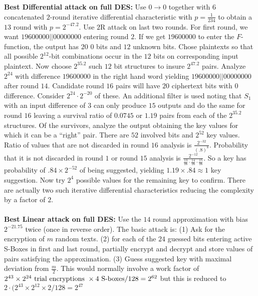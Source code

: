 \\
\\
{\bf Best Differential attack on full DES: }
Use $0 \rightarrow 0$ together with $6$ concatenated $2$-round iterative differential 
characteristic with $p= {\frac 1 {234}}$ to obtain a $13$ round with $p= 2^{-47.2}$.
Use $2$R attack on last two rounds.  For first round, we want $19 60 00 00 || 00 00 00 00$
entering round $2$.  If we get $19 60 00 00$ to enter the $F$-function, the output
has $20$ $0$ bits and $12$ unknown bits. Chose plaintexts so that all possible
$2^{12}$-bit combinations occur in the $12$ bits on corresponding input plaintext.
Now choose $2^{35.2}$ such $12$ bit structures to insure $2^{47.2}$ pairs.  Analyze 
$2^{24}$ with difference $19 60 00 00$ in the right hand word yielding
$19 60 00 00 || 00 00 00 00$ after round $14$.  Candidate round $16$ pairs will have
$20$ ciphertext bits with $0$ difference.  Consider $2^{24} \cdot 2^{-20}$ of these.
An additional filter is used noting that $S_1$ with an input difference of $3$ can
only produce $15$ outputs and do the same for round $16$ leaving a survival ratio
of $0.0745$ or $1.19$ pairs from each of the $2^{35.2}$ structures.  Of the survivors,
analyze the output obtaining the key values for which it can be a ``right'' pair.
There are $52$ involved bits and $2^{52}$ key values.  Ratio of values that are not
discarded in round $16$ analysis is ${\frac {2^{-32}} {(.8)^8}}$.  
Probability that it
is not discarded in round $1$ or round $15$ analysis is ${\frac {2^{-12}} {
{\frac {13} {16}} \cdot
{\frac {14} {16}} \cdot
{\frac {15} {16}}}}$.  So a key has probability of $.84 \times 2^{-52}$ of being
suggested, yielding $1.19 \times .84 \approx 1$ key suggestion.  Now try
$2^4$ possible values for the remaining key to confirm.  There are actually two
such iterative differential characteristics reducing the complexity by a factor of
$2$.
\\
\\
{\bf Best Linear attack on full DES: }
Use the $14$ round approximation with bias $2^{-21.75}$ twice (once in reverse order).
The basic attack is:
(1) Ask for the encryption of $m$ random texts. (2) for each of the $24$ guessed bits
entering active S-Boxes in first and last round, partially encrypt and decrypt and
store values of pairs satisfying the approximation.  (3) Guess suggested key with maximal
deviation from ${\frac m 2}$.  This would normally involve a work factor of
$2^{43} \times 2^{24} \textnormal{ trial encryptions } \times 4 \textnormal{ S-boxes}
/ 128= 2^{62}$ but this is reduced to $2 \cdot (2^{43} \times 2^{12} \times 2 / 128= 2^{47}$
